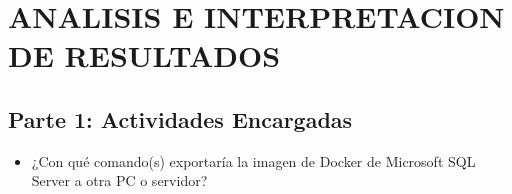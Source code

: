 \section{ANALISIS E INTERPRETACION DE RESULTADOS} 


\subsection{Parte 1: Actividades Encargadas}
	\begin{itemize}
		\item ¿Con qué comando(s) exportaría la imagen de Docker de Microsoft SQL Server a otra PC o servidor?
		
	\end{itemize}



